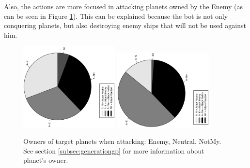 \documentclass[conference]{IEEEtran}
\begin{document}
Also, the actions are more focused in attacking planets owned by the Enemy (as can be seen in Figure \ref{figura:tarta_attacking_who}). This can be explained because the bot is not only conquering planets, but also destroying enemy ships that will not be used against him.
\begin{figure}[htb]
\tiny
\begin{center}

    \includegraphics[trim=1cm 7cm 1cm 7cm, clip=true,width=5cm,angle=-90]{./imags/distribution_initial_target.eps}
    \includegraphics[trim=1cm 7cm 1cm 7cm, clip=true,width=5cm,angle=-90]{./imags/distribution_final_target.eps}

\end{center}
\caption{Owners of target planets when attacking: Enemy, Neutral, NotMy. See section \ref{subsec:generationgp} for more information about planet's owner.} %
\label{figura:tarta_attacking_who}
\end{figure}
\end{document}
